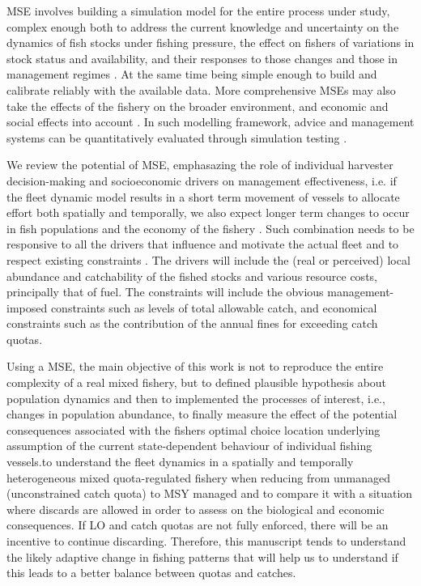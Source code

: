 \documentclass[12pt,oneline,a4paper,numbib]{ouparticle}
\numberwithin{equation}{subsection} %
\begin{document}
MSE involves building a simulation model for the entire process under study, complex enough both to address the current knowledge and uncertainty on the dynamics of fish stocks under fishing pressure, the effect on fishers of variations in stock status and availability, and their responses to those changes and those in management regimes \cite{Venables2009}. At the same time being simple enough to build and calibrate reliably with the available data. More comprehensive MSEs may also take the effects of the fishery on the broader environment, and economic and social effects into account \cite{Dichmont2008, Fulton2007}. In such modelling framework, advice and management systems can be quantitatively evaluated through simulation testing \cite{Dichmont2013, Kell2007}. 

We review the potential of MSE, emphasazing the role of individual harvester decision-making and socioeconomic drivers on management effectiveness, i.e. if the fleet dynamic model results in a short term movement of vessels to allocate effort both spatially and temporally, we also expect longer term changes to occur in fish populations and the economy of the fishery \cite{Alzorriz2018}. Such combination needs to be responsive to all the drivers that influence and motivate the actual fleet and to respect existing constraints \cite{Venables2009}. The drivers will include the (real or perceived) local abundance and catchability of the fished stocks and various resource costs, principally that of fuel. The constraints will include the obvious management-imposed constraints such as levels of total allowable catch, and economical constraints such as the contribution of the annual fines for exceeding catch quotas.

Using a MSE, the main objective of this work is not to reproduce the entire complexity of a real mixed fishery, but to defined plausible hypothesis about population dynamics and then to implemented the processes of interest, i.e., changes in population abundance, to finally measure the effect of the potential consequences associated with the fishers optimal choice location underlying assumption of the current state-dependent behaviour of individual fishing vessels.to understand the fleet dynamics in a spatially and temporally heterogeneous mixed quota-regulated fishery when reducing from unmanaged (unconstrained catch quota) to MSY managed and to compare it with a situation where discards are allowed in order to assess on the biological and economic consequences. If LO and catch quotas are not fully enforced, there will be an incentive to continue discarding. Therefore, this manuscript tends to understand the likely adaptive change in fishing patterns that will help us to understand if this leads to a better balance between quotas and catches.
\end{document}
